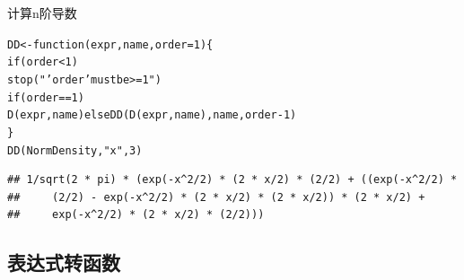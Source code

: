 \documentclass[a4paper]{ctexart}\usepackage[]{graphicx}\usepackage[]{color}
\makeatletter
\newcommand{\hlnum}[1]{\textcolor[rgb]{0.502,0.086,1}{#1}}%
\newcommand{\hlstr}[1]{\textcolor[rgb]{1,0.4,0.2}{#1}}%
\newcommand{\hlopt}[1]{\textcolor[rgb]{0.251,0.251,0.251}{#1}}%
\newcommand{\hlstd}[1]{\textcolor[rgb]{0.251,0.251,0.251}{#1}}%
\newcommand{\hlkwa}[1]{\textcolor[rgb]{0.941,0.188,0.816}{#1}}%
\newcommand{\hlkwb}[1]{\textcolor[rgb]{0,0.439,0.902}{#1}}%
\newcommand{\hlkwc}[1]{\textcolor[rgb]{0.188,0.941,0.314}{#1}}%
\newcommand{\hlkwd}[1]{\textcolor[rgb]{0.69,0.188,0.941}{#1}}%
\newenvironment{kframe}{%
 \def\at@end@of@kframe{}%
 \ifinner\ifhmode%
  \def\at@end@of@kframe{\end{minipage}}%
  \begin{minipage}{\columnwidth}%
 \fi\fi%
 \def\FrameCommand##1{\hskip\@totalleftmargin \hskip-\fboxsep
 \colorbox{shadecolor}{##1}\hskip-\fboxsep
     \hskip-\linewidth \hskip-\@totalleftmargin \hskip\columnwidth}%
 \MakeFramed {\advance\hsize-\width
   \@totalleftmargin\z@ \linewidth\hsize
   \@setminipage}}%
 {\par\unskip\endMakeFramed%
 \at@end@of@kframe}
\newenvironment{knitrout}{}{} %
\makeatother
\begin{document}
计算n阶导数
\begin{knitrout}
\color{fgcolor}\begin{kframe}
\begin{alltt}
\hlstd{DD} \hlkwb{<-} \hlkwa{function}\hlstd{(}\hlkwc{expr}\hlstd{,} \hlkwc{name}\hlstd{,} \hlkwc{order} \hlstd{=} \hlnum{1}\hlstd{) \{}
    \hlkwa{if} \hlstd{(order} \hlopt{<} \hlnum{1}\hlstd{)}
        \hlkwd{stop}\hlstd{(}\hlstr{"'order' must be >= 1"}\hlstd{)}
    \hlkwa{if} \hlstd{(order} \hlopt{==} \hlnum{1}\hlstd{)}
        \hlkwd{D}\hlstd{(expr, name)} \hlkwa{else} \hlkwd{DD}\hlstd{(}\hlkwd{D}\hlstd{(expr, name), name, order} \hlopt{-} \hlnum{1}\hlstd{)}
\hlstd{\}}
\hlkwd{DD}\hlstd{(NormDensity,} \hlstr{"x"}\hlstd{,} \hlnum{3}\hlstd{)}
\end{alltt}
\begin{verbatim}
## 1/sqrt(2 * pi) * (exp(-x^2/2) * (2 * x/2) * (2/2) + ((exp(-x^2/2) * 
##     (2/2) - exp(-x^2/2) * (2 * x/2) * (2 * x/2)) * (2 * x/2) + 
##     exp(-x^2/2) * (2 * x/2) * (2/2)))
\end{verbatim}
\end{kframe}
\end{knitrout}

\subsection{表达式转函数}
\end{document}

